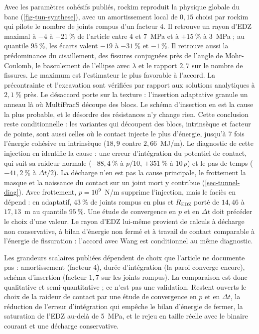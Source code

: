 Avec les paramètres cohésifs publiés, rockim reproduit la physique globale du banc (\cref{fig-tun-synthese}), avec un amortissement local de $0{,}15$ choisi par rockim qui pilote le nombre de joints rompus d'un facteur 4. Il retrouve un rayon d'EDZ maximal à $-4$ à $-21~\%$ de l'article entre 4 et 7~MPa et à $+15~\%$ à 3~MPa ; au quantile $95~\%$, les écarts valent $-19$ à $-31~\%$ et $-1~\%$. Il retrouve aussi la prédominance du cisaillement, des fissures conjuguées près de l'angle de Mohr-Coulomb, le basculement de l'ellipse avec $\lambda$ et le rapport $2{,}7$ sur le nombre de fissures. Le maximum est l'estimateur le plus favorable à l'accord. La précontrainte et l'excavation sont vérifiées par rapport aux solutions analytiques à $2{,}1~\%$ près. Le désaccord porte sur la texture : l'insertion adaptative granule un anneau là où MultiFracS découpe des blocs. Le schéma d'insertion en est la cause la plus probable, et le désordre des résistances n'y change rien. Cette conclusion reste conditionnelle : les variantes qui découpent des blocs, intrinsèque et facteur de pointe, sont aussi celles où le contact injecte le plus d'énergie, jusqu'à 7 fois l'énergie cohésive en intrinsèque ($18{,}9$ contre $2{,}66$~MJ/m). Le diagnostic de cette injection en identifie la cause : une erreur d'intégration du potentiel de contact, qui suit sa raideur normale ($-88{,}4~\%$ à $p/10$, $+351~\%$ à $10\,p$) et le pas de temps ($-41{,}2~\%$ à $\Delta t/2$). La décharge  n'en est pas la cause principale, le frottement la masque et la naissance du contact sur un joint mort y contribue (\cref{sec-tunnel-diag}). Avec frottement, $p = 10^9$~N/m supprime l'injection, mais le faciès en dépend : en adaptatif, $43~\%$ de joints rompus en plus et $R_\text{EDZ}$ porté de $14{,}46$ à $17{,}13$~m au quantile $95~\%$. Une étude de convergence en $p$ et en $\Delta t$ doit précéder le choix d'une valeur. Le rayon d'EDZ lui-même provient de calculs à décharge non conservative, à bilan d'énergie non fermé et à travail de contact comparable à l'énergie de fissuration : l'accord avec Wang est conditionnel au même diagnostic.

Les grandeurs scalaires publiées dépendent de choix que l'article ne documente pas : amortissement (facteur 4), durée d'intégration (la paroi converge encore), schéma d'insertion (facteur $1{,}7$ sur les joints rompus). La comparaison est donc qualitative et semi-quantitative ; ce n'est pas une validation. Restent ouverts le choix de la raideur de contact par une étude de convergence en $p$ et en $\Delta t$, la réduction de l'erreur d'intégration qui empêche le bilan d'énergie de fermer, la saturation de l'EDZ au-delà de 5~MPa, et le rejeu en taille réelle avec le binaire courant et une décharge conservative.
